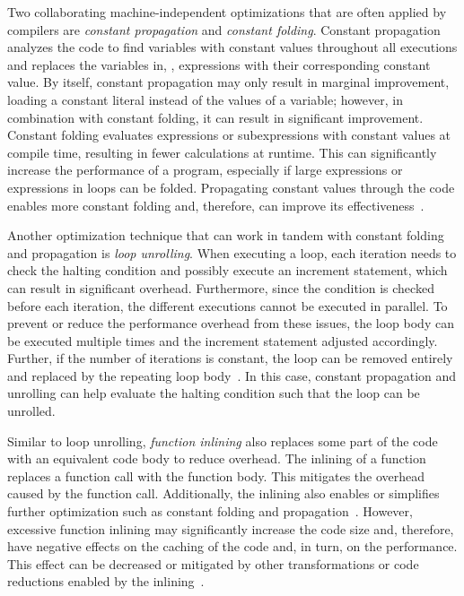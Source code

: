 Two collaborating machine-independent optimizations that are often applied by compilers are \emph{constant propagation} and \emph{constant folding}. Constant propagation analyzes the code to find variables with constant values throughout all executions and replaces the variables in, \eg, expressions with their corresponding constant value. By itself, constant propagation may only result in marginal improvement, loading a constant literal instead of the values of a variable; however, in combination with constant folding, it can result in significant improvement. Constant folding evaluates expressions or subexpressions with constant values at compile time, resulting in fewer calculations at runtime. This can significantly increase the performance of a program, especially if large expressions or expressions in loops can be folded. Propagating constant values through the code enables more constant folding and, therefore, can improve its effectiveness~\cite{WeZa91}.

Another optimization technique that can work in tandem with constant folding and propagation is \emph{loop unrolling}. When executing a loop, each iteration needs to check the halting condition and possibly execute an increment statement, which can result in significant overhead. Furthermore, since the condition is checked before each iteration, the different executions cannot be executed in parallel. To prevent or reduce the performance overhead from these issues, the loop body can be executed multiple times and the increment statement adjusted accordingly. Further, if the number of iterations is constant, the loop can be removed entirely and replaced by the repeating loop body~\cite{HuLe99}. In this case, constant propagation and unrolling can help evaluate the halting condition such that the loop can be unrolled.

Similar to loop unrolling, \emph{function inlining} also replaces some part of the code with an equivalent code body to reduce overhead. The inlining of a function replaces a function call with the function body. This mitigates the overhead caused by the function call. Additionally, the inlining also enables or simplifies further optimization such as constant folding and propagation~\cite{TGS22}. However, excessive function inlining may significantly increase the code size and, therefore, have negative effects on the caching of the code and, in turn, on the performance. This effect can be decreased or mitigated by other transformations or code reductions enabled by the inlining~\cite{PeMa02}.

